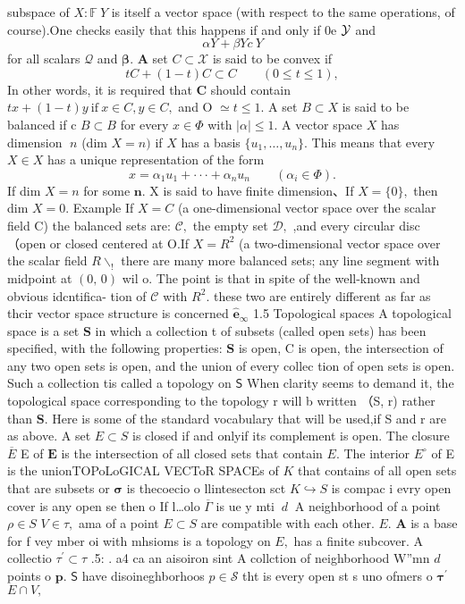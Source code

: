 subspace of $X:\mathbb{F}\ Y$ is itself a vector space (with respect to the same operations, of course).One checks easily that this happens if and only if 0e ${\cal{Y}}$ and $$ \alpha Y+\beta Y c\ Y $$ for all scalars $\textstyle{\mathcal{Q}}$ and ${\boldsymbol{\beta}}.$ $\mathbf{A}$ set $C\subset{\mathcal{X}}$ is said to be convex if $$ t C+(1-t)C\subset C\qquad(0\leq t\leq1), $$ In other words, it is required that ${\boldsymbol{C}}$ should contain $t x+(1-t)y{\mathrm{~if~}}x\in C,y\in C,$ and O $\simeq t\leq1.$ $\mathrm{A}$ set $B\subset X$ is said to be balanced if c $\scriptstyle B\subset B$ for every $x\in\Phi$ with $|\alpha|\leq1.$ A vector space $\textstyle X$ has dimension $\;n$ (dim $X=n)$ if $\textstyle X$ has a basis $\{u_{1},\ldots,u_{n}\}.$ This means that every $X\in X$ has a unique representation of the form $$ x=\alpha_{1}u_{1}+\cdot\cdot\cdot+\alpha_{n}u_{n}\qquad(\alpha_{i}\in\Phi). $$ If dim $X=n$ for some ${\boldsymbol{n}}.$ X is said to have finite dimension、If $X=\{0\},$ then dim $X=0.$ Example If $X=C$ (a one-dimensional vector space over the scalar field C) the balanced sets are: ${\mathcal{C}},$ the empty set ${\mathcal{D}},$ ,and every circular disc （open or closed centered at O.If $X=R^{2}$ (a two-dimensional vector space over the scalar field $\textstyle R\backslash_{!}$ there are many more balanced sets; any line segment with midpoint at $\scriptstyle(0,\,0)$ wil o. The point is that in spite of the well-known and obvious idcntifica- tion of ${\mathcal{C}}$ with $R^{2}.$ these two are entirely different as far as thcir vector space structure is concerned $\mathbf{\hat{e}}_{\infty}$ 1.5 Topological spaces A topological space is a set $\mathbf{S}$ in which a collection t of subsets (called open sets) has been specified, with the following properties: $\boldsymbol{S}$ is open, C is open, the intersection of any two open sets is open, and the union of every collec tion of open sets is open. Such a collection tis called a topology on $\boldsymbol{\mathsf{S}}$ When clarity seems to demand it, the topological space corresponding to the topology r will b written （S, r) rather than ${\boldsymbol{S}}.$ Here is some of the standard vocabulary that will be used,if S and r are as above. A set $\scriptstyle{E\subset S}$ is closed if and onlyif its complement is open. The closure $\overline{{E}}$ E of $\boldsymbol{E}$ is the intersection of all closed sets that contain $E.$ The interior $E^{\circ}$ of E is the unionTOPoLoGICAL VECToR SPACEs of $\textstyle K$ that contains of all open sets that are subsets or $\textstyle{\boldsymbol{\sigma}}$ is thecoecio o llintesecton sct $K\hookrightarrow S$ is compac i evry open cover is any open se then o If l…olo $\overline{{\Gamma}}$ is ue y mti $\ d{\mathrm{~}}$ A neighborhood of a point $\rho\in S$ $V\in\tau,$ ama of a point $E\subset S$ are compatible with each other. $E.$ $\mathbf{A}$ is a base for f vey mber oi with mhsioms is a topology on $E,$ has a finite subcover. A collectio $\tau^{\prime}\subset\tau$ .5: . a4 ca an aisoiron sint A collction of neighborhood W”mn $d$ points o ${\boldsymbol{p}}.$ $\boldsymbol{\mathsf{S}}$ have disoineghborhoos $p\in{\mathcal{S}}$ tht is every open st s uno ofmers o ${\boldsymbol{\tau}}^{\prime}$ $E\cap V,$ 